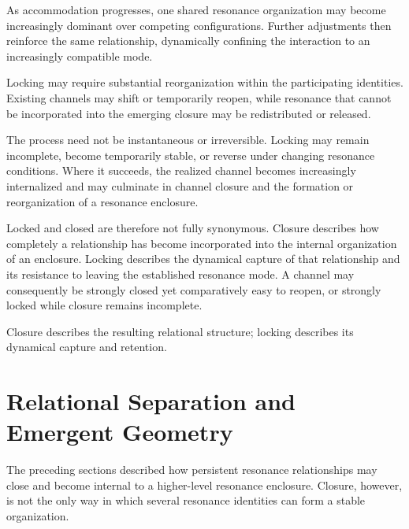 \documentclass[11pt,a4paper]{article}
\begin{document}

As accommodation progresses, one shared resonance organization may become increasingly dominant over competing configurations. Further adjustments then reinforce the same relationship, dynamically confining the interaction to an increasingly compatible mode.

Locking may require substantial reorganization within the participating identities. Existing channels may shift or temporarily reopen, while resonance that cannot be incorporated into the emerging closure may be redistributed or released.

The process need not be instantaneous or irreversible. Locking may remain incomplete, become temporarily stable, or reverse under changing resonance conditions. Where it succeeds, the realized channel becomes increasingly internalized and may culminate in channel closure and the formation or reorganization of a resonance enclosure.

Locked and closed are therefore not fully synonymous. Closure describes how completely a relationship has become incorporated into the internal organization of an enclosure. Locking describes the dynamical capture of that relationship and its resistance to leaving the established resonance mode. A channel may consequently be strongly closed yet comparatively easy to reopen, or strongly locked while closure remains incomplete.

Closure describes the resulting relational structure; locking describes its dynamical capture and retention.




\section{Relational Separation and Emergent Geometry}

The preceding sections described how persistent resonance relationships may close and become internal to a higher-level resonance enclosure. Closure, however, is not the only way in which several resonance identities can form a stable organization.
\end{document}
